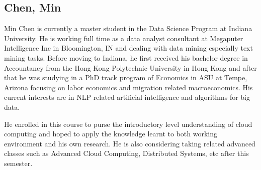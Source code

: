 
\subsection{Chen, Min}

Min Chen is currently a master student in the Data Science Program at Indiana University. He is working
full time as a data analyst consultant at Megaputer Intelligence Inc in Bloomington, IN and dealing with data mining
especially text mining tasks. Before moving to Indiana, he first received his bachelor degree in Accountancy from the
Hong Kong Polytechnic University in Hong Kong and after that he was studying in a PhD track program of Economics in ASU
at Tempe, Arizona focusing on labor economics and migration related macroeconomics. His current interests are in NLP
related artificial intelligence and algorithms for big data.

He enrolled in this course to purse the introductory level understanding of cloud computing and hoped to apply the
knowledge learnt to both working environment and his own research. He is also considering taking related advanced
classes such as Advanced Cloud Computing, Distributed Systems, etc after this semester.